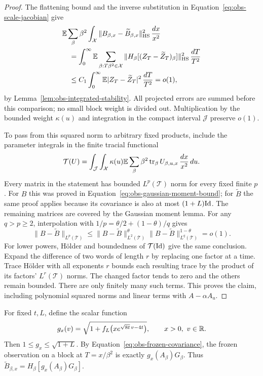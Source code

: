 \begin{proof}
The flattening bound and the inverse substitution in
Equation~\eqref{eq:obs-scale-jacobian} give
\begin{align*}
 &\mathbb E\sum_\beta\beta^2\int_{\mathcal X}
 \|B_{\beta,x}-\widetilde B_{\beta,x}\|_{\mathrm{HS}}^2\,\frac{dx}{x^2}
 \\
 &\quad=\int_0^\infty\mathbb E\sum_{\beta:T\beta^2\in\mathcal X}
 \|H_\beta[(Z_T-\widetilde Z_T)_\beta]\|_{\mathrm{HS}}^2\,\frac{dT}{T^2}
 \\
 &\quad\le C_1\int_0^\infty
 \mathbb E|Z_T-\widetilde Z_T|^2\,\frac{dT}{T^2}=o(1),
\end{align*}
by Lemma~\ref{lem:obs-integrated-stability}.  All projected errors
are summed before this comparison; no small block weight is divided
out.  Multiplication by the bounded weight $\kappa(u)$ and
integration in the compact interval $\mathcal J$ preserve $o(1)$.

To pass from this squared norm to arbitrary fixed products, include
the parameter integrals in the finite tracial functional
\[
 \mathcal T(U)=\int_{\mathcal J}\int_{\mathcal X}
 \kappa(u)\mathbb E\sum_\beta\beta^2\operatorname{tr}_\beta U_{\beta,u,x}
 \,\frac{dx}{x^2}\,du.
\]
Every matrix in the statement has bounded $L^p(\mathcal T)$ norm
for every fixed finite $p$.  For $B$ this was proved in
Equation~\eqref{eq:obs-gaussian-moment-bound}; for $\widetilde B$
the same proof applies because its covariance is also at most
$(1+L)\mathrm{Id}$.  The remaining matrices are covered by the Gaussian
moment lemma.  For any $q>p\ge2$, interpolation with
$1/p=\theta/2+(1-\theta)/q$ gives
\[
 \|B-\widetilde B\|_{L^p(\mathcal T)}
 \le\|B-\widetilde B\|_{L^2(\mathcal T)}^\theta
       \|B-\widetilde B\|_{L^q(\mathcal T)}^{1-\theta}=o(1).
\]
For lower powers, H\"older and boundedness of
$\mathcal T(\mathrm{Id})$ give the same conclusion.  Expand the difference
of two words of length $r$ by replacing one factor at a time.
Trace H\"older with all exponents $r$ bounds each resulting trace
by the product of its factors' $L^r(\mathcal T)$ norms.  The changed
factor tends to zero and the others remain bounded.  There are
only finitely many such terms.  This proves the claim, including
polynomial squared norms and linear terms with $A-\alpha A_u$.
\end{proof}

For fixed $t,L$, define the scalar function
\begin{equation}\label{eq:obs-g-function}
 g_x(v)=\sqrt{1+f_L\big(xe^{\sqrt{8t}\,v-4t}\big)},
 \qquad x>0,\ v\in\mathbb R.
\end{equation}
Then $1\le g_x\le\sqrt{1+L}$.  By
Equation~\eqref{eq:obs-frozen-covariance}, the frozen observation on
a block at $T=x/\beta^2$ is exactly
$g_x(A_\beta)G_\beta$.  Thus
$\widetilde B_{\beta,x}=H_\beta[g_x(A_\beta)G_\beta]$.

